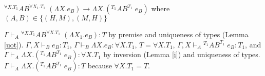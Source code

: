 \begin{case}
$^{\forall X.T_{1}}AB^{\forall X_{1}.T_{1}}\;(\Lambda X.e_{B})\rightarrow\Lambda X.(^{T_{1}}AB^{T_{1}}\;e_{B})$ where $(A,B)\in\lbrace(H,M),(M,H)\rbrace$

$\Gamma\vdash_{A}{^{\forall X.T_{1}}A}B^{\forall X.T_{1}}\;(\Lambda X_{1}.e_{B}):T$ by premise and uniqueness of types (Lemma \ref{uot}).  $\Gamma,X\vdash_{B}e_{B}:T_{1}$, $\Gamma\vdash_{B}\Lambda X.e_{B}:\forall X.T_{1}$, $T=\forall X.T_{1}$, $\Gamma,X\vdash_{A}{^{T_{1}}A}B^{T_{1}}\;e_{B}:T_{1}$, and $\Gamma\vdash_{A}\Lambda X.(^{T_{1}}AB^{T_{1}}\;e_{B}):\forall X.T_{1}$ by inversion (Lemma \ref{i}) and uniqueness of types.  $\Gamma\vdash_{A}\Lambda X.(^{T_{1}}AB^{T_{1}}\;e_{B}):T$ because $\forall X.T_{1}=T$.
\end{case}